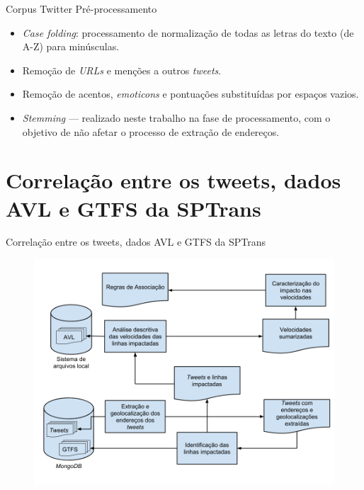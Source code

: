 \documentclass{beamer}
\begin{document}
\begin{frame}{Corpus Twitter}
Pré-processamento
\begin{itemize}
\item \textit{Case folding}: processamento de normalização de todas as letras do texto (de A-Z) para minúsculas.
\item Remoção de \textit{URLs} e menções a outros \textit{tweets}.
\item Remoção de acentos, \textit{emoticons} e pontuações substituídas por espaços vazios.
\item \textit{Stemming} --- realizado neste trabalho na fase de processamento, com o objetivo de não afetar o processo de extração de endereços. 
\end{itemize}

\end{frame}
\section{Correlação entre os tweets, dados AVL e GTFS da SPTrans}
\begin{frame}{Correlação entre os tweets, dados AVL e GTFS da SPTrans}
\begin{figure}
\includegraphics[width=0.9\linewidth]{caracterization_flow.png}
\end{figure}
\end{frame}
\end{document}
